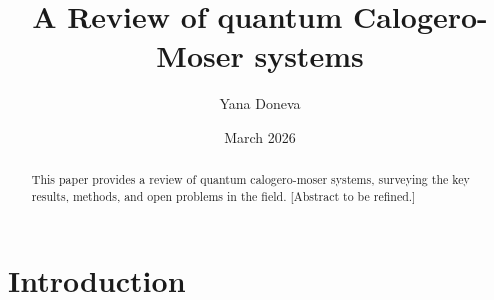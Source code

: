 \documentclass[12pt]{article}
\title{A Review of quantum Calogero-Moser systems}
\author{Yana Doneva}
\date{March 2026}
\begin{document}
                                                                                                                                                                                                 
                                                                                                                                                                                                                    
\maketitle                                                                                                                                                                                                         
                
\begin{abstract}                                                                                                                                                                                                 
This paper provides a review of quantum calogero-moser systems, surveying the key results,
methods, and open problems in the field. [Abstract to be refined.]                                                                                                                                                  
\end{abstract}                                                                                                                                                                                                   
                                                                                                                                                                                                                    
\tableofcontents                                                                                                                                                                                                   
                
\section{Introduction}                                                                                                                                                                                           
                
\end{document}
